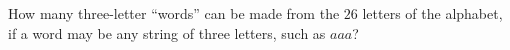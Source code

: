 How many three-letter ``words'' can be made from the $26$ letters of the alphabet, if a word may be any string of three letters, such as $aaa$?
